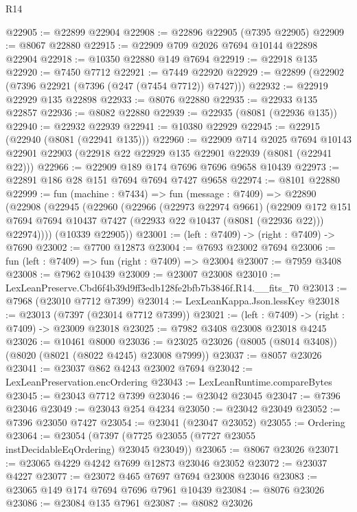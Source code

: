 \begin{lexlean}{R14}
\begin{coremodule}
@22905 := @22899 @22904
@22908 := @22896 @22905 (@7395 @22905)
@22909 := @8067 @22880
@22915 := @22909 @709 @2026 @7694 @10144 @22898 @22904
@22918 := @10350 @22880 @149 @7694
@22919 := @22918 @135
@22920 := @7450 @7712
@22921 := @7449 @22920
@22929 := @22899 (@22902 (@7396 @22921 (@7396 (@247 (@7454 @7712)) @7427)))
@22932 := @22919 @22929 @135 @22898
@22933 := @8076 @22880
@22935 := @22933 @135 @22857
@22936 := @8082 @22880
@22939 := @22935 (@8081 (@22936 @135))
@22940 := @22932 @22939
@22941 := @10380 @22929
@22945 := @22915 (@22940 (@8081 (@22941 @135)))
@22960 := @22909
    @714
    @2025
    @7694
    @10143
    @22901
    @22903
    (@22918 @22 @22929 @135 @22901 @22939 (@8081 (@22941 @22)))
@22966 := @22909 @189 @174 @7696 @7696 @9658 @10439
@22973 := @22891 @186 @28 @151 @7694 @7694 @7427 @9658
@22974 := @8101 @22880
@22999 := fun (machine : @7434) =>
  fun (message : @7409) =>
  @22890
    (@22908
      (@22945
        (@22960
          (@22966
            (@22973 @22974 @9661)
            (@22909
              @172
              @151
              @7694
              @7694
              @10437
              @7427
              (@22933 @22 @10437 (@8081 (@22936 @22)))
              @22974))))
      (@10339 @22905))
@23001 := (left : @7409) -> (right : @7409) -> @7690
@23002 := @7700 @12873
@23004 := @7693 @23002 @7694
@23006 := fun (left : @7409) => fun (right : @7409) => @23004
@23007 := @7959 @3408
@23008 := @7962 @10439
@23009 := @23007 @23008
@23010 := LexLeanPreserve.Cbd6f4b39d9ff3edb128fe2bfb7b3846f.R14.__fits_70
@23013 := @7968 (@23010 @7712 @7399)
@23014 := LexLeanKappa.Json.lessKey
@23018 := @23013 (@7397 (@23014 @7712 @7399))
@23021 := (left : @7409) -> (right : @7409) -> @23009 @23018
@23025 := @7982 @3408 @23008 @23018 @4245
@23026 := @10461 @8000
@23036 := @23025 @23026 (@8005 (@8014 @3408)) (@8020 (@8021 (@8022 @4245) @23008 @7999))
@23037 := @8057 @23026
@23041 := @23037 @862 @4243 @23002 @7694
@23042 := LexLeanPreservation.encOrdering
@23043 := LexLeanRuntime.compareBytes
@23045 := @23043 @7712 @7399
@23046 := @23042 @23045
@23047 := @7396 @23046
@23049 := @23043 @254 @4234
@23050 := @23042 @23049
@23052 := @7396 @23050 @7427
@23054 := @23041 (@23047 @23052)
@23055 := Ordering
@23064 := @23054 (@7397 (@7725 @23055 (@7727 @23055 instDecidableEqOrdering) @23045 @23049))
@23065 := @8067 @23026
@23071 := @23065 @4229 @4242 @7699 @12873 @23046 @23052
@23072 := @23037 @4227
@23077 := @23072 @465 @7697 @7694 @23008 @23046
@23083 := @23065 @149 @174 @7694 @7696 @7961 @10439
@23084 := @8076 @23026
@23086 := @23084 @135 @7961
@23087 := @8082 @23026

\end{coremodule}
\end{lexlean}

